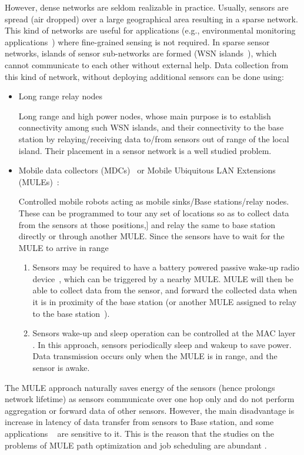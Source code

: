 However, dense networks are seldom realizable in practice. Usually, sensors are spread (air dropped) over a large geographical area resulting in a sparse network. This kind of networks are useful for applications (e.g., environmental monitoring applications~\cite{sparseEx}) where fine-grained sensing is not required. In sparse sensor networks, islands of sensor sub-networks are formed (WSN islands~\cite{intro2}), which cannot communicate to each other without external help. Data collection from this kind of network, without deploying additional sensors can be done using:
\begin{itemize}
\item Long range relay nodes~\cite{relayNodes}
  
Long range and high power nodes, whose main purpose is to establish connectivity among such WSN islands, and their connectivity to the base station by relaying/receiving data to/from sensors out of range of the local island. Their placement in a sensor network is a well studied problem.
\item Mobile data collectors (MDCs)~\cite{intro3} or Mobile Ubiquitous LAN Extensions (MULEs)~\cite{intro1}: 
  
Controlled mobile robots acting as mobile sinks/Base stations/relay nodes. These can be programmed to tour any set of locations so as to collect data from the sensors at those positions,] and relay the same to base station directly or through another MULE. Since the sensors have to wait for the MULE to arrive in range
\begin{enumerate}
\item Sensors may be required to have a battery powered passive wake-up radio device~\cite{intro4}, which can be triggered by a nearby MULE. MULE will then be able to collect data from the sensor, and forward the collected data 
when it is in proximity of the base station (or another MULE assigned to relay to the base station~\cite{sim2}). %

\item Sensors wake-up and sleep operation can be controlled at the MAC layer~\cite{dutyCycle1} \cite{dutyCycle2}. In this approach, sensors periodically sleep and wakeup to save power. Data transmission occurs only when the MULE is in range, and the sensor is awake.
\end{enumerate}
\end{itemize}

The MULE approach naturally saves energy of the sensors (hence prolongs network lifetime) as sensors communicate over one hop only and do not perform aggregation or forward data of other sensors. However, the main disadvantage is increase in latency of data transfer from sensors to Base station, and some applications ~\cite{application4} are sensitive to it. This is the reason that the studies on the problems of MULE path optimization and job scheduling are abundant \cite{muleSurvey}.

